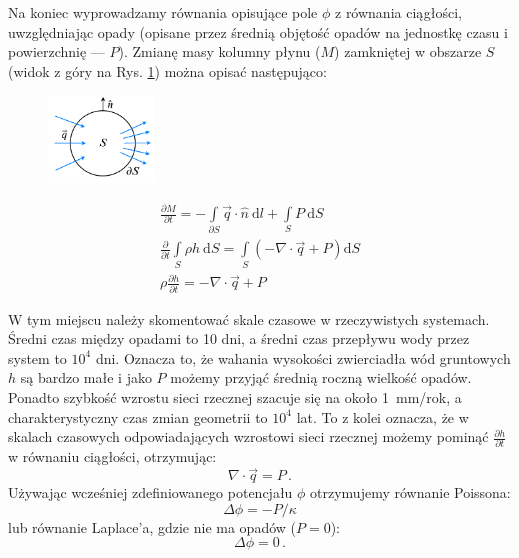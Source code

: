 \documentclass[]{pracamgr}
\begin{document}
      Na koniec wyprowadzamy równania opisujące pole $\phi$ z równania ciągłości, uwzględniając opady (opisane przez średnią objętość opadów na jednostkę czasu i powierzchnię — $P$). Zmianę masy kolumny płynu ($M$) zamkniętej w obszarze $S$ (widok z góry na Rys. \ref{zachowanie_masy}) można opisać następująco:
    
      \begin{figure}
        \vspace{-8pt}
        \includegraphics[width=0.25\textwidth]{figs/zachowanie_masy.png}
        \vspace{-15pt}
        \caption{}
        \vspace{-1000pt}
        \label{zachowanie_masy}
      \end{figure}
      \begin{gather*}
        \frac{\partial M}{\partial t}=- \int\limits_{\partial S} \vec{q}\cdot \hat{n} \ \textrm{d}l + \int\limits_S P \ \textrm{d}S
        \\
        \frac{\partial}{\partial t} \int\limits_S \rho h \ \textrm{d}S=\int\limits_S \left(-\nabla \cdot \vec{q} + P\right)\textrm{d}S
        \\
        \rho \frac{\partial h}{\partial t}=-\nabla \cdot \vec{q} + P
      \end{gather*}	

      W tym miejscu należy skomentować skale czasowe w rzeczywistych systemach. Średni czas między opadami to 10 dni, a średni czas przepływu wody przez system to $10^4$ dni. Oznacza to, że wahania wysokości zwierciadła wód gruntowych $h$ są bardzo małe i jako $P$ możemy przyjąć średnią roczną wielkość opadów. Ponadto szybkość wzrostu sieci rzecznej szacuje się na około 1~mm/rok, a charakterystyczny czas zmian geometrii to $10^4$ lat. To z kolei oznacza, że w skalach czasowych odpowiadających wzrostowi sieci rzecznej możemy pominąć $ \frac{\partial h} {\partial t} $ w równaniu ciągłości, otrzymując:
      \begin{equation}
    		\nabla \cdot \vec{q} = P \,.
    	\end{equation}
      Używając wcześniej zdefiniowanego potencjału $\phi$ otrzymujemy równanie Poissona:
      \begin{equation}
        \label{poisson}
    		\Delta \phi = -P/\kappa
    	\end{equation}
      lub równanie Laplace'a, gdzie nie ma opadów ($P=0$):
      \begin{equation}\label{laplace}
    		\Delta \phi = 0 \,.
    	\end{equation}	
\end{document}
